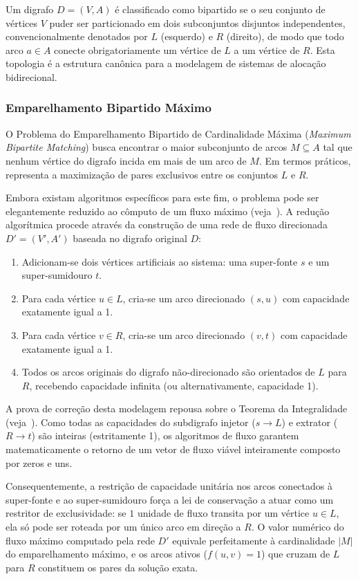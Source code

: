 \documentclass[12pt,a4paper]{article}
\begin{document}
Um digrafo $D = (V, A)$ é classificado como bipartido se o seu conjunto de vértices $V$ puder ser particionado em dois subconjuntos disjuntos independentes, convencionalmente denotados por $L$ (esquerdo) e $R$ (direito), de modo que todo arco $a \in A$ conecte obrigatoriamente um vértice de $L$ a um vértice de $R$. Esta topologia é a estrutura canônica para a modelagem de sistemas de alocação bidirecional.

\subsubsection{Emparelhamento Bipartido Máximo}

O Problema do Emparelhamento Bipartido de Cardinalidade Máxima (\textit{Maximum Bipartite Matching}) busca encontrar o maior subconjunto de arcos $M \subseteq A$ tal que nenhum vértice do digrafo incida em mais de um arco de $M$. Em termos práticos, representa a maximização de pares exclusivos entre os conjuntos $L$ e $R$.

Embora existam algoritmos específicos para este fim, o problema pode ser elegantemente reduzido ao cômputo de um fluxo máximo (veja~\cite{ahuja1993network}). A redução algorítmica procede através da construção de uma rede de fluxo direcionada $D' = (V', A')$ baseada no digrafo original $D$:
\begin{enumerate}
    \item Adicionam-se dois vértices artificiais ao sistema: uma super-fonte $s$ e um super-sumidouro $t$.
    \item Para cada vértice $u \in L$, cria-se um arco direcionado $(s, u)$ com capacidade exatamente igual a 1.
    \item Para cada vértice $v \in R$, cria-se um arco direcionado $(v, t)$ com capacidade exatamente igual a 1.
    \item Todos os arcos originais do digrafo não-direcionado são orientados de $L$ para $R$, recebendo capacidade infinita (ou alternativamente, capacidade 1).
\end{enumerate}

A prova de correção desta modelagem repousa sobre o Teorema da Integralidade (veja~\cite{korte2018combinatorial}). Como todas as capacidades do subdigrafo injetor ($s \rightarrow L$) e extrator ($R \rightarrow t$) são inteiras (estritamente 1), os algoritmos de fluxo garantem matematicamente o retorno de um vetor de fluxo viável inteiramente composto por zeros e uns.

Consequentemente, a restrição de capacidade unitária nos arcos conectados à super-fonte e ao super-sumidouro força a lei de conservação a atuar como um restritor de exclusividade: se $1$ unidade de fluxo transita por um vértice $u \in L$, ela só pode ser roteada por um único arco em direção a $R$. O valor numérico do fluxo máximo computado pela rede $D'$ equivale perfeitamente à cardinalidade $|M|$ do emparelhamento máximo, e os arcos ativos ($f(u,v) = 1$) que cruzam de $L$ para $R$ constituem os pares da solução exata.
\end{document}
